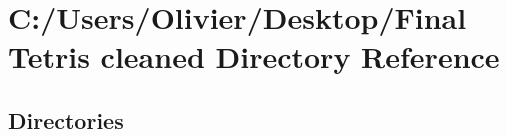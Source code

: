 \section{C\+:/\+Users/\+Olivier/\+Desktop/\+Final Tetris cleaned Directory Reference}
\label{dir_199a12da5851ce02667b8904b1371555}
\subsection*{Directories}
\begin{DoxyCompactItemize}
\end{DoxyCompactItemize}
